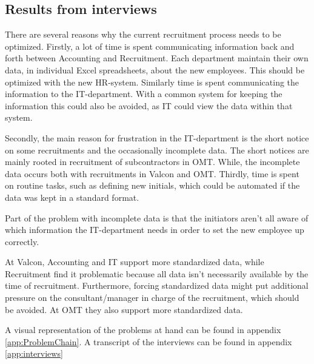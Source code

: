 \subsection{Results from interviews}
There are several reasons why the current recruitment process needs to be optimized.
Firstly, a lot of time is spent communicating information back and forth between Accounting and Recruitment. 
Each department maintain their own data, in individual Excel spreadsheets, about the new employees. 
This should be optimized with the new HR-system.
Similarly time is spent communicating the information to the IT-department.
With a common system for keeping the information this could also be avoided, as IT could view the data within that system.

Secondly, the main reason for frustration in the IT-department is the short notice on some recruitments and the occasionally incomplete data.
The short notices are mainly rooted in recruitment of subcontractors in OMT.
While, the incomplete data occurs both with recruitments in Valcon and OMT.
Thirdly, time is spent on routine tasks, such as defining new initials, which could be automated if the data was kept in a standard format.

Part of the problem with incomplete data is that the initiators aren't all aware of which information the IT-department needs in order to set the new employee up correctly.

At Valcon, Accounting and IT support more standardized data, while Recruitment find it problematic because all data isn't necessarily available by the time of recruitment.
Furthermore, forcing standardized data might put additional pressure on the consultant/manager in charge of the recruitment, which should be avoided.
At OMT they also support more standardized data.

A visual representation of the problems at hand can be found in appendix \ref{app:ProblemChain}.
A transcript of the interviews can be found in appendix \ref{app:interviews}
